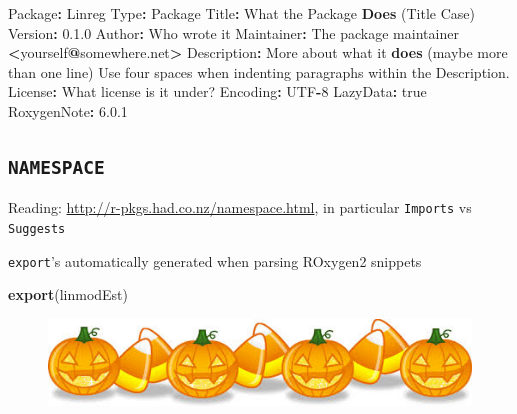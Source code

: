 \documentclass[]{book}
\newenvironment{Shaded}{\begin{snugshade}}{\end{snugshade}}
\newcommand{\KeywordTok}[1]{\textcolor[rgb]{0.13,0.29,0.53}{\textbf{#1}}}
\newcommand{\DecValTok}[1]{\textcolor[rgb]{0.00,0.00,0.81}{#1}}
\newcommand{\FloatTok}[1]{\textcolor[rgb]{0.00,0.00,0.81}{#1}}
\newcommand{\StringTok}[1]{\textcolor[rgb]{0.31,0.60,0.02}{#1}}
\newcommand{\OperatorTok}[1]{\textcolor[rgb]{0.81,0.36,0.00}{\textbf{#1}}}
\newcommand{\NormalTok}[1]{#1}
\theoremstyle{definition}
\theoremstyle{definition}
\theoremstyle{definition}
\theoremstyle{remark}
\begin{document}
\begin{Shaded}
\begin{Highlighting}[]
\NormalTok{Package}\OperatorTok{:}\StringTok{ }\NormalTok{Linreg}
\NormalTok{Type}\OperatorTok{:}\StringTok{ }\NormalTok{Package}
\NormalTok{Title}\OperatorTok{:}\StringTok{ }\NormalTok{What the Package }\KeywordTok{Does}\NormalTok{ (Title Case)}
\NormalTok{Version}\OperatorTok{:}\StringTok{ }\FloatTok{0.1}\NormalTok{.}\DecValTok{0}
\NormalTok{Author}\OperatorTok{:}\StringTok{ }\NormalTok{Who wrote it}
\NormalTok{Maintainer}\OperatorTok{:}\StringTok{ }\NormalTok{The package maintainer }\OperatorTok{<}\NormalTok{yourself}\OperatorTok{@}\NormalTok{somewhere.net}\OperatorTok{>}
\NormalTok{Description}\OperatorTok{:}\StringTok{ }\NormalTok{More about what it }\KeywordTok{does}\NormalTok{ (maybe more than one line)}
\NormalTok{    Use four spaces when indenting paragraphs within the Description.}
\NormalTok{License}\OperatorTok{:}\StringTok{ }\NormalTok{What license is it under?}
\NormalTok{Encoding}\OperatorTok{:}\StringTok{ }\NormalTok{UTF}\OperatorTok{-}\DecValTok{8}
\NormalTok{LazyData}\OperatorTok{:}\StringTok{ }\NormalTok{true}
\NormalTok{RoxygenNote}\OperatorTok{:}\StringTok{ }\FloatTok{6.0}\NormalTok{.}\DecValTok{1}
\end{Highlighting}
\end{Shaded}

\subsection{\texorpdfstring{\texttt{NAMESPACE}}{NAMESPACE}}\label{namespace}

Reading: \url{http://r-pkgs.had.co.nz/namespace.html}, in particular
\texttt{Imports} vs \texttt{Suggests}

\texttt{export}'s automatically generated when parsing ROxygen2 snippets

\begin{Shaded}
\begin{Highlighting}[]
\KeywordTok{export}\NormalTok{(linmodEst)}
\end{Highlighting}
\end{Shaded}

\begin{figure}

{\centering \includegraphics[width=6.86in]{images/ch3_pumpkin} 

}

\end{figure}
\end{document}
